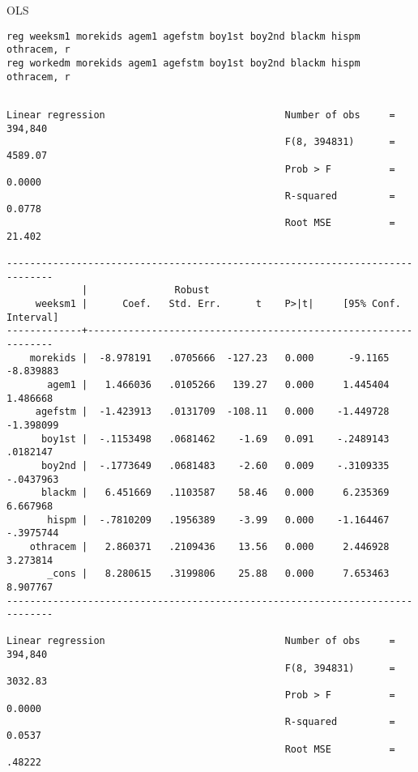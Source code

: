 \documentclass[11pt]{article}
\begin{document}
OLS
\begin{verbatim}
reg weeksm1 morekids agem1 agefstm boy1st boy2nd blackm hispm othracem, r
reg workedm morekids agem1 agefstm boy1st boy2nd blackm hispm othracem, r
\end{verbatim}

\begin{verbatim}

Linear regression                               Number of obs     =    394,840
                                                F(8, 394831)      =    4589.07
                                                Prob > F          =     0.0000
                                                R-squared         =     0.0778
                                                Root MSE          =     21.402

------------------------------------------------------------------------------
             |               Robust
     weeksm1 |      Coef.   Std. Err.      t    P>|t|     [95% Conf. Interval]
-------------+----------------------------------------------------------------
    morekids |  -8.978191   .0705666  -127.23   0.000      -9.1165   -8.839883
       agem1 |   1.466036   .0105266   139.27   0.000     1.445404    1.486668
     agefstm |  -1.423913   .0131709  -108.11   0.000    -1.449728   -1.398099
      boy1st |  -.1153498   .0681462    -1.69   0.091    -.2489143    .0182147
      boy2nd |  -.1773649   .0681483    -2.60   0.009    -.3109335   -.0437963
      blackm |   6.451669   .1103587    58.46   0.000     6.235369    6.667968
       hispm |  -.7810209   .1956389    -3.99   0.000    -1.164467   -.3975744
    othracem |   2.860371   .2109436    13.56   0.000     2.446928    3.273814
       _cons |   8.280615   .3199806    25.88   0.000     7.653463    8.907767
------------------------------------------------------------------------------

Linear regression                               Number of obs     =    394,840
                                                F(8, 394831)      =    3032.83
                                                Prob > F          =     0.0000
                                                R-squared         =     0.0537
                                                Root MSE          =     .48222


\end{verbatim}
\end{document}
